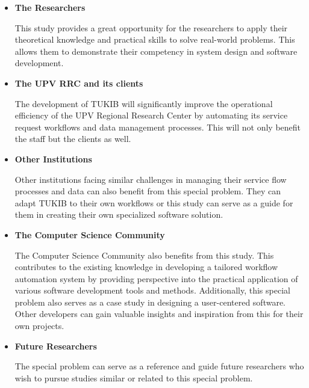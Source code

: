 \begin{itemize}
	
\item \textbf{The Researchers}

This study provides a great opportunity for the researchers to apply their theoretical knowledge and practical skills to solve real-world problems. This allows them to demonstrate their competency in system design and software development. \newline

\item \textbf{The UPV RRC and its clients}

The development of TUKIB will significantly improve the operational efficiency of the UPV Regional Research Center by automating its service request workflows and data management processes. This will not only benefit the staff but the clients as well.\newline

\item \textbf{Other Institutions}

Other institutions facing similar challenges in managing their service flow processes and data can also benefit from this special problem. They can adapt TUKIB to their own workflows or this study can serve as a guide for them in creating their own specialized software solution. \newline

\item \textbf{The Computer Science Community}

The Computer Science Community also benefits from this study. This contributes to the existing knowledge in developing a tailored workflow automation system by providing perspective into the practical application of various software development tools and  methods. Additionally, this special problem also serves as a case study in designing  a user-centered software. Other developers can gain valuable insights and inspiration from this for their own projects.\newline

\item \textbf{Future Researchers}

The special problem can serve as a reference and guide future
researchers who wish to pursue studies similar or related to this special problem.\newline

\end {itemize}

